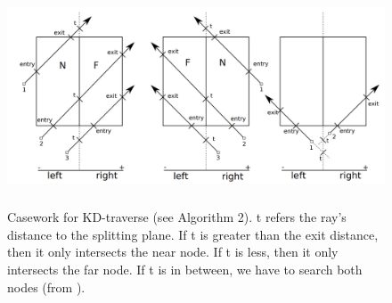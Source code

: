 \documentclass{article}
\begin{document}
\begin{figure}[!h]
\begin{center}
  \includegraphics[width=15cm, height=6.5cm]{Casework.jpg}
  \caption{Casework for KD-traverse (see Algorithm 2). t refers the ray's distance to the splitting plane. If t is greater than the exit distance, then it only intersects the near node. If t is less, then it only intersects the far node. If t is in between, we have to search both nodes (from \cite{Hapala}).}
\end{center}
\end{figure}
\end{document}
